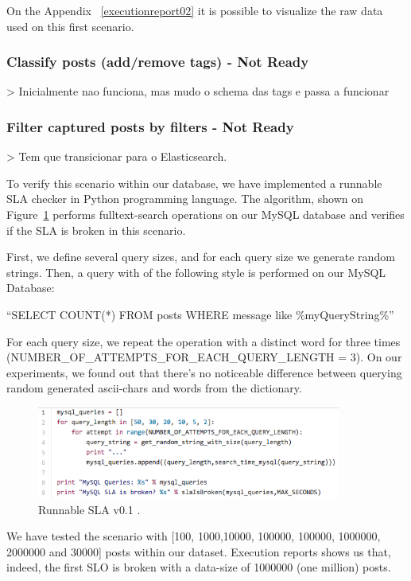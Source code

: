 On the Appendix ~\ref{executionreport02} it is possible to visualize the raw data used on this first scenario. 

\subsubsection{Classify posts (add/remove tags) - Not Ready}
> Inicialmente nao funciona, mas mudo o schema das tags e passa a funcionar

\subsubsection{Filter captured posts by filters - Not Ready}
> Tem que transicionar para o Elasticsearch.

To verify this scenario within our database, we have implemented a runnable SLA checker in Python programming language. The algorithm, shown on Figure~\ref{fig:algorithmSLA01} performs fulltext-search operations on our MySQL database and verifies if the SLA is broken in this scenario. 

First, we define several query sizes, and for each query size we generate random strings. Then, a query with of the following style is performed on our MySQL Database: 

 ``SELECT COUNT(*) FROM posts WHERE message like \%myQueryString\%''

For each query size, we repeat the operation with a distinct word for three times (NUMBER\_OF\_ATTEMPTS\_FOR\_EACH\_QUERY\_LENGTH = 3). On our experiments, we found out that there's no noticeable difference between querying random generated ascii-chars and words from the dictionary.

\begin{figure}[ht!]
\centering
\includegraphics[width=100mm]{algorithmSLA01.png}
\caption{Runnable SLA v0.1 .\label{fig:algorithmSLA01}}
\end{figure}	

We have tested the scenario with [100, 1000,10000, 100000, 100000, 1000000, 2000000 and 30000] posts within our dataset. Execution reports shows us that, indeed, the first SLO is broken with a data-size of 1000000 (one million) posts.

